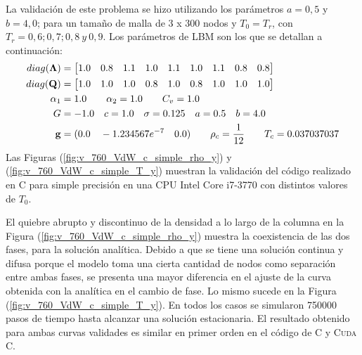 La validación de este problema se hizo utilizando los parámetros $a =0,5$ y $b = 4,0$; para un tamaño de malla de 3 x 300 nodos y $T_0 = T_r$, con $T_r = 0,6 ; 0,7 ; 0,8 \> y \> 0,9$.  Los parámetros de LBM son los que se detallan a continuación:
\begin{align*}
\centering
diag(\mathbf{\Lambda}) & = 
\begin{bmatrix}
1.0 & 0.8 & 1.1 & 1.0 & 1.1 & 1.0 & 1.1 & 0.8 & 0.8 \\
\end{bmatrix}\\
diag(\mathbf{Q}) & = 
\begin{bmatrix}
1.0 & 1.0 & 1.0 & 0.8 & 1.0 & 0.8 & 1.0 & 1.0 & 1.0 \\
\end{bmatrix}\\
\alpha_{1} & = 1.0 \qquad 	\alpha_{2} = 1.0 \qquad C_{v} = 1.0\\
G & = -1.0 \quad c = 1.0 \quad \sigma = 0.125 \quad a = 0.5 \quad b = 4.0 \\
\mathbf{g} & = (0.0 \quad-1.234567e^{-7}\quad 0.0 ) \qquad \rho_c = \frac{1}{12} \qquad T_c = 0.037037037
\end{align*}
Las Figuras (\ref{fig:v_760_VdW_c_simple_rho_y}) y (\ref{fig:v_760_VdW_c_simple_T_y})  muestran la validación del código realizado en \textsc{C} para simple precisión en una CPU Intel Core i7-3770 con distintos valores de $T_0$. 

El quiebre abrupto y discontinuo de la densidad a lo largo de la columna en la Figura (\ref{fig:v_760_VdW_c_simple_rho_y}) muestra la coexistencia de las dos fases, para la solución analítica. Debido a que se tiene una solución continua y difusa porque el modelo toma una cierta cantidad de nodos como separación entre ambas fases, se presenta una mayor diferencia en el ajuste de la curva obtenida con la analítica en el cambio de fase. Lo mismo sucede en la Figura (\ref{fig:v_760_VdW_c_simple_T_y}). En todos los casos se simularon 750000 pasos de tiempo hasta alcanzar una solución estacionaria. El resultado obtenido para ambas curvas validades es similar en primer orden en el código de \textsc{C} y \textsc{Cuda C}.

